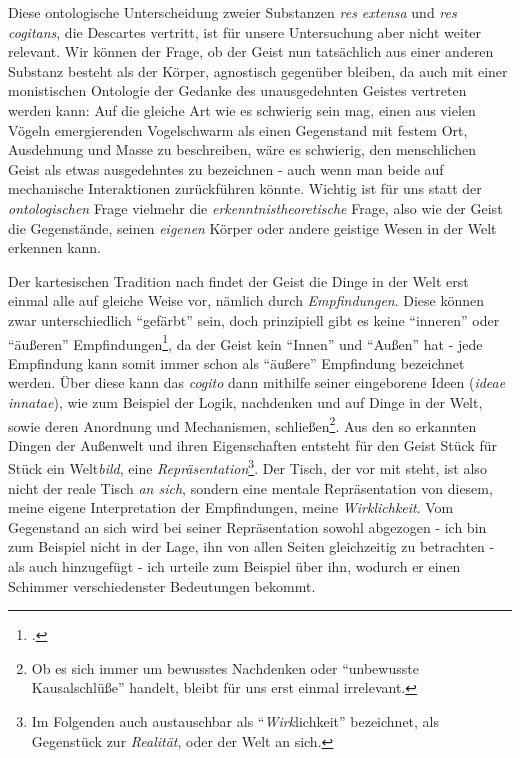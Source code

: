 \documentclass[a4paper, 12pt]{article}
\begin{document}
\begin{onehalfspace}
Diese ontologische Unterscheidung zweier Substanzen \emph{res extensa} und \emph{res cogitans}, die Descartes vertritt, ist für unsere Untersuchung aber nicht weiter relevant. Wir können der Frage, ob der Geist nun tatsächlich aus einer anderen Substanz besteht als der Körper, agnostisch gegenüber bleiben, da auch mit einer monistischen Ontologie der Gedanke des unausgedehnten Geistes vertreten werden kann: Auf die gleiche Art wie es schwierig sein mag, einen aus vielen Vögeln emergierenden Vogelschwarm als einen Gegenstand mit festem Ort, Ausdehnung und Masse zu beschreiben, wäre es schwierig, den menschlichen Geist als etwas ausgedehntes zu bezeichnen - auch wenn man beide auf mechanische Interaktionen zurückführen könnte. Wichtig ist für uns statt der \emph{ontologischen} Frage vielmehr die \emph{erkenntnistheoretische} Frage, also wie der Geist die Gegenstände, seinen \emph{eigenen} Körper oder andere geistige Wesen in der Welt erkennen kann.


Der kartesischen Tradition nach findet der Geist die Dinge in der Welt erst einmal alle auf gleiche Weise vor, nämlich durch \emph{Empfindungen}. Diese können zwar unterschiedlich "`gefärbt"' sein, doch prinzipiell gibt es keine "`inneren"' oder "`äußeren"' Empfindungen\footnote{\Cite[Vgl.][S. ?? (501?)]{scheler-ethik}.}, da der Geist kein "`Innen"' und "`Außen"' hat - jede Empfindung kann somit immer schon als "`äußere"' Empfindung bezeichnet werden. Über diese kann das \emph{cogito} dann mithilfe seiner eingeborene Ideen (\emph{ideae innatae}), wie zum Beispiel der Logik, nachdenken und auf Dinge in der Welt, sowie deren Anordnung und Mechanismen, schließen\footnote{Ob es sich immer um bewusstes Nachdenken oder "`unbewusste Kausalschlüße"' handelt, bleibt für uns erst einmal irrelevant.}. Aus den so erkannten Dingen der Außenwelt und ihren Eigenschaften entsteht für den Geist Stück für Stück ein Welt\emph{bild}, eine \emph{Repräsentation}\footnote{Im Folgenden auch austauschbar als "`\emph{Wirk}lichkeit"' bezeichnet, als Gegenstück zur \emph{Realität}, oder der Welt an sich.}. Der Tisch, der vor mit steht, ist also nicht der reale Tisch \emph{an sich}, sondern eine mentale Repräsentation von diesem, meine eigene Interpretation der Empfindungen, meine \emph{Wirklichkeit}. Vom Gegenstand an sich wird bei seiner Repräsentation sowohl abgezogen - ich bin zum Beispiel nicht in der Lage, ihn von allen Seiten gleichzeitig zu betrachten - als auch hinzugefügt - ich urteile zum Beispiel über ihn, wodurch er einen Schimmer verschiedenster Bedeutungen bekommt.


\end{onehalfspace}
\end{document}
